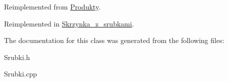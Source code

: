 Reimplemented from \mbox{\hyperlink{class_produkty_a49c2ba4084346df8e7c987b9ec62676e}{Produkty}}.



Reimplemented in \mbox{\hyperlink{class_skrzynka__z__srubkami_a62ccdf02cb9d364630ebea27ea94f2a3}{Skrzynka\+\_\+z\+\_\+srubkami}}.



The documentation for this class was generated from the following files\+:\begin{DoxyCompactItemize}
\item 
Srubki.\+h\item 
Srubki.\+cpp\end{DoxyCompactItemize}
